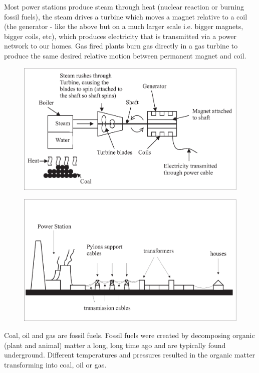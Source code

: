 Most power stations produce steam through heat (nuclear reaction or burning fossil fuels), the steam drives a turbine which moves a magnet relative to a coil (the generator - like the above but on a much larger scale i.e. bigger magnets, bigger coils, etc), which produces electricity that is transmitted via a power network to our homes. Gas fired plants burn gas directly in a gas turbine to produce the same desired relative motion between permanent magnet and coil.

\begin{figure}[H]
\centering
\includegraphics[scale=0.4]{../../epsimages/2SteamPower.eps}
\end{figure}

\begin{figure}[H]
\centering
\includegraphics[scale=0.4]{../../epsimages/3PowerStation.eps}
\end{figure}

Coal, oil and gas are fossil fuels. Fossil fuels were created by
decomposing organic (plant and animal) matter a long, long time ago
and are typically found underground. Different temperatures and
pressures resulted in the organic matter transforming into coal, oil
or gas.

